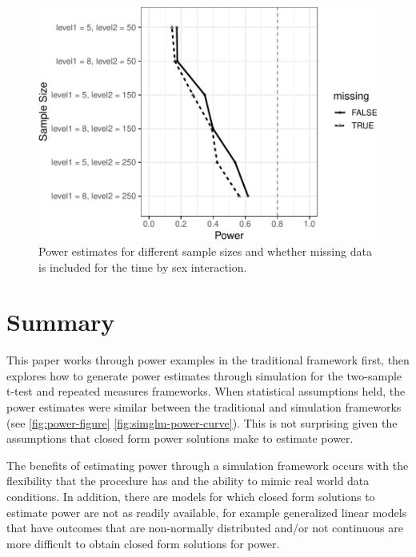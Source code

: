\documentclass[man,mask,floatsintext]{apa6}
\begin{document}
\begin{figure}
\centering
\includegraphics{power_simulation_files/figure-latex/long-power-curve-ts-1.pdf}
\caption{\label{fig:long-power-curve-ts}Power estimates for different sample sizes and whether missing data is included for the time by sex interaction.}
\end{figure}

\hypertarget{summary}{%
\section{Summary}\label{summary}}

This paper works through power examples in the traditional framework first, then explores how to generate power estimates through simulation for the two-sample t-test and repeated measures frameworks. When statistical assumptions held, the power estimates were similar between the traditional and simulation frameworks (see \ref{fig:power-figure} \ref{fig:simglm-power-curve}). This is not surprising given the assumptions that closed form power solutions make to estimate power.

The benefits of estimating power through a simulation framework occurs with the flexibility that the procedure has and the ability to mimic real world data conditions. In addition, there are models for which closed form solutions to estimate power are not as readily available, for example generalized linear models that have outcomes that are non-normally distributed and/or not continuous are more difficult to obtain closed form solutions for power.
\end{document}
